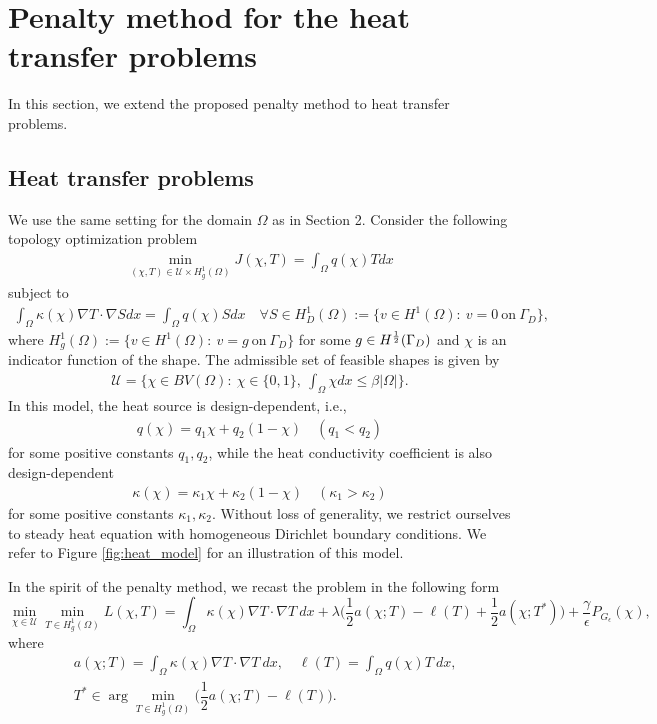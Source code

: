 \documentclass{amsart}
\begin{document}

\section{Penalty method for the heat transfer problems}\label{sec:heat}
In this section, we extend the proposed penalty method to heat transfer problems. 
\subsection{Heat transfer problems}
We use the same setting for the domain $\Omega$ as in Section 2. Consider the following topology optimization problem
\begin{align}
\min_{(\chi,T)\in\mathcal{U}\times H^1_g(\Omega)}J(\chi,T) = \int_{\Omega}q(\chi)Tdx
\end{align}
subject to 
\begin{align}\label{heat:state}
\int_{\Omega}\kappa(\chi)\nabla T\cdot\nabla Sdx = \int_{\Omega}q(\chi)Sdx\quad \forall S\in H_D^1(\Omega):=\{v\in H^1(\Omega):\ v=0\ \mbox{on}\ \Gamma_D\},
\end{align}
where $H^1_g(\Omega):=\{v\in H^1(\Omega):\ v=g\ \mbox{on}\ \Gamma_D\}$ for some $g\in H^{1\over 2}(\Gamma_D)$ and $\chi$ is an indicator function of the shape. The admissible set of feasible shapes is given by 
\begin{eqnarray}
\mathcal{U} =\Big\{\chi\in BV(\Omega):\ \chi\in \{0,1\},\ \int_{\Omega}\chi dx \leq\beta|\Omega|\Big\}.\nonumber
\end{eqnarray}
In this model, the heat source is design-dependent, i.e., 
\begin{eqnarray}
q(\chi)=q_1\chi + q_2(1-\chi)\quad (q_1<q_2)\nonumber
\end{eqnarray}
for some positive constants $q_1,q_2$, while the heat conductivity coefficient is also design-dependent
\begin{eqnarray}
\kappa(\chi) = \kappa_1\chi+ \kappa_2(1-\chi)\quad(\kappa_1>\kappa_2)\nonumber
\end{eqnarray}
for some positive constants $\kappa_1,\kappa_2$. Without loss of generality, we restrict ourselves to steady heat equation with homogeneous Dirichlet boundary conditions. We refer to Figure \ref{fig:heat_model} for an illustration of this model.

In the spirit of the penalty method, we recast the problem in the following form
\begin{equation}
    \min_{\chi\in\mathcal{U}}\min_{T\in  H_g^1(\Omega)}L(\chi,T) = \int_{\Omega}\kappa(\chi)\nabla T\cdot\nabla T\ dx+\lambda\Big(\dfrac{1}{2}a(\chi;T)-\ell(T)+\dfrac{1}{2}a(\chi;T^*)\Big)+\dfrac{\gamma}{\epsilon}P_{G_\epsilon}(\chi),
\end{equation}
where
\begin{align}
    &a(\chi;T)=\int_\Omega\kappa(\chi)\nabla T\cdot\nabla T\ dx,\quad \ell(T)=\int_\Omega q(\chi)T \ dx,\\
    &T^*\in \arg\min  _{T\in H_g^1(\Omega)}\Big(\dfrac{1}{2}a(\chi;T)-\ell(T)\Big).
\end{align}
\end{document}
